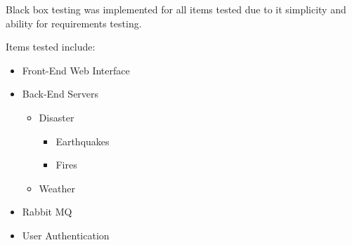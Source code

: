 Black box testing was implemented for all items tested due to it simplicity and ability for requirements testing.

Items tested include:

\begin{itemize}

	\item Front-End Web Interface
			
	\item Back-End Servers
		\begin{itemize}
			\item Disaster
				\begin{itemize}
					\item Earthquakes
					\item Fires
				\end{itemize}
			\item Weather
		\end{itemize}
		
	\item Rabbit MQ
	
	\item User Authentication
	
	
\end{itemize}